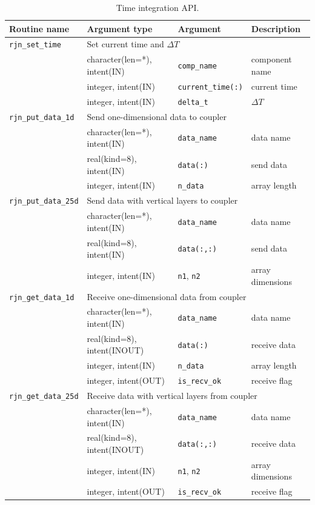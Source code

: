 \documentclass[11pt,a4paper]{report}
\begin{document}
\begin{table}[H]
\begin{center}
\caption{Time integration API.}
{\small
\label{table:rjn_api_integration}
\begin{tabular}{llll}
\hline\hline
Routine name & Argument type & Argument & Description \\
\hline
 \texttt{rjn\_set\_time} &  \multicolumn{3}{l}{Set current time and $\Delta T$}\\
           &  character(len=*), intent(IN) &  \texttt{comp\_name} & component name\\
           &  integer, intent(IN) &  \texttt{current\_time(:)} & current time\\
           &  integer, intent(IN) &  \texttt{delta\_t} & $\Delta T$\\
\hline
 \texttt{rjn\_put\_data\_1d} & \multicolumn{3}{l}{Send one-dimensional data to coupler} \\
                & character(len=*), intent(IN) & \texttt{data\_name} & data name\\
                & real(kind=8), intent(IN) & \texttt{data(:)} & send data\\
                & integer, intent(IN) & \texttt{n\_data} & array length\\
\hline
 \texttt{rjn\_put\_data\_25d} & \multicolumn{3}{l}{Send data with vertical layers to coupler} \\
                & character(len=*), intent(IN) & \texttt{data\_name} & data name\\
                & real(kind=8), intent(IN) & \texttt{data(:,:)} & send data\\
                & integer, intent(IN) & \texttt{n1}, \texttt{n2} & array dimensions\\
\hline
 \texttt{rjn\_get\_data\_1d} & \multicolumn{3}{l}{Receive one-dimensional data from coupler} \\
                & character(len=*), intent(IN) & \texttt{data\_name} & data name\\
                & real(kind=8), intent(INOUT) & \texttt{data(:)} & receive data\\
                & integer, intent(IN) & \texttt{n\_data} & array length\\
                & integer, intent(OUT) & \texttt{is\_recv\_ok} & receive flag\\
\hline
 \texttt{rjn\_get\_data\_25d} & \multicolumn{3}{l}{Receive data with vertical layers from coupler} \\
                & character(len=*), intent(IN) & \texttt{data\_name} & data name\\
                & real(kind=8), intent(INOUT) & \texttt{data(:,:)} & receive data\\
                & integer, intent(IN) & \texttt{n1}, \texttt{n2} & array dimensions\\
                & integer, intent(OUT) & \texttt{is\_recv\_ok} & receive flag\\
\hline\hline
\end{tabular}
}
\end{center}
\end{table}
\end{document}
